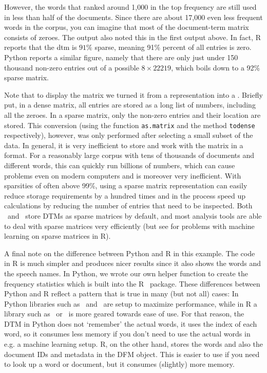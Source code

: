 However, the words that ranked around 1,000 in the top frequency are still used in less than half of the documents.
Since there are about 17,000 even less frequent words in the corpus, you can imagine that most of the document-term matrix consists of zeroes. 
The output also noted this  in the first output above.
In fact, R reports that the dtm is $91\%$ sparse, meaning 91\% percent of all entries is zero.
Python reports a similar figure, namely that there are only just under 150 thousand non-zero entries
out of a possible $8\times22219$, which boils down to a 92\% sparse matrix.

Note that to display the matrix we turned it from a  representation into a .
Briefly put, in a dense matrix, all entries are stored as a long list of numbers, including all the zeroes.
In a sparse matrix,  only the non-zero entries and their location are stored. 
This conversion (using the function \verb|as.matrix| and the method \verb|todense| respectively), however, was only performed after selecting a small subset of the data.
In general,  it is very inefficient to store and work with the matrix in a  format.
For a reasonably large corpus with tens of thousands of documents and different words, this can quickly run billions of numbers,
which can cause problems even on modern computers and is moreover very inefficient.
With sparsities of often above 99\%, using a sparse matrix representation can easily reduce storage requirements by a hundred times and in the process speed up calculations by reducing the number of entries that need to be inspected.
Both \quanteda\ and \sklearn\ store DTMs as sparse matrices by default,
and most analysis tools are able to deal with sparse matrices very efficiently
(but see  for problems with machine learning on sparse matrices in R). 

A final note on the difference between Python and R in this example.
The code in R is much simpler and produces nicer results since it also shows the words and the speech names.
In Python, we wrote our own helper function to create the frequency statistics which is built into the R \quanteda\ package.
These differences between Python and R reflect a pattern that is true in many (but not all) cases:
In Python libraries such as \numpy\ and \sklearn\ are setup to maximize performance,
while in R a library such as \quanteda\ or \tidyverse\ is more geared towards ease of use.
For that reason, the DTM in Python does not `remember' the actual words, it uses the index of each word,
so it consumes less memory if you don't need to use the actual words in e.g. a machine learning setup.
R, on the other hand, stores the words and also the document IDs and metadata in the DFM object.
This is easier to use if you need to look up a word or document, but it consumes (slightly) more memory. 


